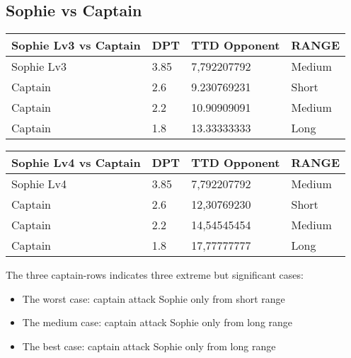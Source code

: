 \subsection{Sophie vs Captain}
\begin{table}[H]
  \centering
\begin{tabular}{|l|l|l|l|}
\hline
\rowcolor[HTML]{C0C0C0} 
\textbf{Sophie Lv3 vs Captain} & \textbf{DPT} & \textbf{TTD Opponent} & \textbf{RANGE} \\ \hline
Sophie Lv3 & 3.85 & 7,792207792 & Medium \\ \hline
Captain & 2.6 & 9.230769231 & Short \\ \hline
Captain & 2.2 & 10.90909091 & Medium \\ \hline
Captain & 1.8 & 13.33333333 & Long \\ \hline
\end{tabular}
\end{table}
\begin{table}[H]
  \centering
\begin{tabular}{|l|l|l|l|}
\hline
\rowcolor[HTML]{C0C0C0} 
\textbf{Sophie Lv4 vs Captain} & \textbf{DPT} & \textbf{TTD Opponent} & \textbf{RANGE} \\ \hline
Sophie Lv4 & 3.85 & 7,792207792 & Medium \\ \hline
Captain & 2.6 & 12,30769230 & Short \\ \hline
Captain & 2.2 & 14,54545454 & Medium \\ \hline
Captain & 1.8 & 17,77777777 & Long \\ \hline
\end{tabular}
\end{table}
The three captain-rows indicates three extreme but significant cases:
\begin{itemize}
\item The worst case: captain attack Sophie only from short range
\item The medium case: captain attack Sophie only  from long range
\item The best case: captain attack Sophie only  from long range
\end{itemize}
